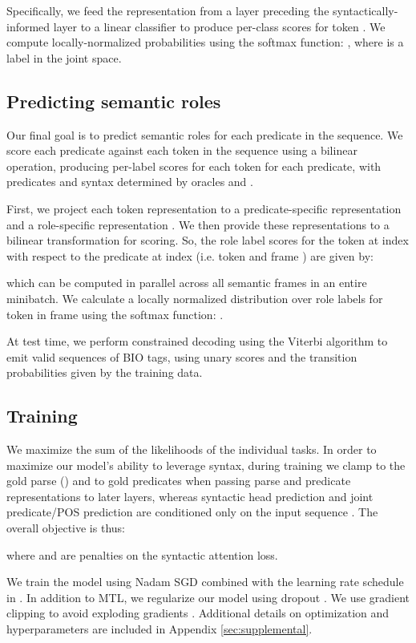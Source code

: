 \documentclass[11pt,a4paper]{article}
\begin{document}
Specifically, we feed the representation  from a layer  preceding the syntactically-informed layer  to a linear classifier to produce per-class scores  for token . We compute locally-normalized probabilities using the softmax function: , where  is a label in the joint space. 


\subsection{Predicting semantic roles \label{sec:srl}}
Our final goal is to predict semantic roles for each predicate in the sequence. We score each predicate
against each token in the sequence using a bilinear operation, producing per-label scores for each token for each predicate, with predicates and syntax determined by oracles  and . 

First, we project each token representation  to a predicate-specific representation  and a role-specific representation .
We then provide these representations to a bilinear transformation  for scoring. So, the role label scores  for the token at index  with respect to the predicate at index  (i.e. token  and frame ) are given by:

which can be computed in parallel across all semantic frames in an entire minibatch. We calculate a locally normalized distribution over role labels for token  in frame  using the softmax function: .

At test time, we perform constrained decoding using the Viterbi algorithm to emit valid sequences of BIO tags, using unary scores  and the transition probabilities given by the training data.

\subsection{Training \label{sec:train-opt}}
We maximize the sum of the likelihoods of the individual tasks.
In order to maximize our model's ability to leverage syntax, during training we clamp  to the gold parse () and  to gold predicates  when passing parse and predicate representations to later layers, whereas syntactic head prediction and joint predicate/POS prediction are conditioned only on the input sequence . The overall objective is thus:

where  and  are penalties on the syntactic attention loss. 


We train the model using Nadam \citep{dozat2016incorporating} SGD combined with the learning rate schedule in \citet{vaswani2017attention}. In addition to MTL, we regularize our model using dropout \citep{srivastava2014dropout}. We use gradient clipping to avoid exploding gradients \citep{bengio1994learning, pascanu2013on}. Additional details on optimization and hyperparameters are included in Appendix \ref{sec:supplemental}.
\end{document}
